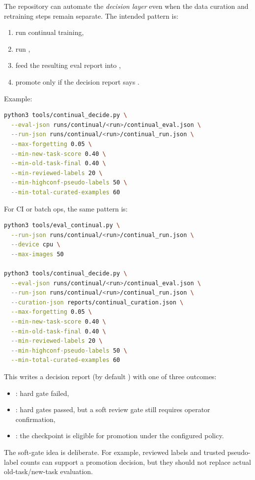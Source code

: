 The repository can automate the \emph{decision layer} even when the data curation and retraining steps remain separate.
The intended pattern is:
\begin{enumerate}
  \item run continual training,
  \item run ,
  \item feed the resulting eval report into ,
  \item promote only if the decision report says .
\end{enumerate}

Example:
\begin{lstlisting}[language=bash]
python3 tools/continual_decide.py \
  --eval-json runs/continual/<run>/continual_eval.json \
  --run-json runs/continual/<run>/continual_run.json \
  --max-forgetting 0.05 \
  --min-new-task-score 0.40 \
  --min-old-task-final 0.40 \
  --min-reviewed-labels 20 \
  --min-highconf-pseudo-labels 50 \
  --min-total-curated-examples 60
\end{lstlisting}

For CI or batch ops, the same pattern is:
\begin{lstlisting}[language=bash]
python3 tools/eval_continual.py \
  --run-json runs/continual/<run>/continual_run.json \
  --device cpu \
  --max-images 50

python3 tools/continual_decide.py \
  --eval-json runs/continual/<run>/continual_eval.json \
  --run-json runs/continual/<run>/continual_run.json \
  --curation-json reports/continual_curation.json \
  --max-forgetting 0.05 \
  --min-new-task-score 0.40 \
  --min-old-task-final 0.40 \
  --min-reviewed-labels 20 \
  --min-highconf-pseudo-labels 50 \
  --min-total-curated-examples 60
\end{lstlisting}

This writes a decision report (by default ) with one of three outcomes:
\begin{itemize}
  \item \cmd{hold}: hard gate failed,
  \item \cmd{review}: hard gates passed, but a soft review gate still requires operator confirmation,
  \item \cmd{promote}: the checkpoint is eligible for promotion under the configured policy.
\end{itemize}

The soft-gate idea is deliberate.
For example, reviewed labels and trusted pseudo-label counts can support a promotion decision, but they should not replace actual old-task/new-task evaluation.

